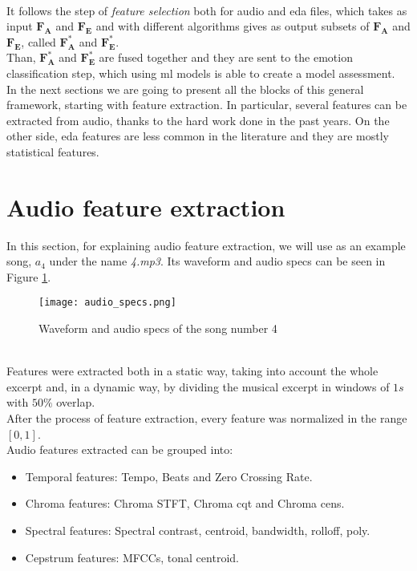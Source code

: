 \\
It follows the step of \textit{feature selection} both for audio and \gls{eda} files, which takes as input $\textbf{F}_\textbf{A}$ and $\textbf{F}_\textbf{E}$ and with different algorithms gives as output subsets of $\textbf{F}_\textbf{A}$ and $\textbf{F}_\textbf{E}$, called $\textbf{F}_\textbf{A}^*$ and $\textbf{F}_\textbf{E}^*$.
\\
Than, $\textbf{F}_\textbf{A}^*$ and $\textbf{F}_\textbf{E}^*$ are fused together and they are sent to the emotion classification step, which using \gls{ml} models is able to create a model assessment.
\\ \indent
In the next sections we are going to present all the blocks of this general framework, starting with feature extraction. In particular, several features can be extracted from audio, thanks to the hard work done in the past years. On the other side, \gls{eda} features are less common in the literature and they are mostly statistical features.

\newpage
\section{Audio feature extraction}
In this section, for explaining audio feature extraction, we will use as an example song, $a_4$ under the name \textit{4.mp3}. Its waveform and audio specs can be seen in Figure \ref{fig:audio_specs}.
\begin{figure}[h]
    \centering
    \texttt{[image: audio\_specs.png]} 
	\caption{Waveform and audio specs of the song number 4}
    \label{fig:audio_specs}
\end{figure}
\\
Features were extracted both in a static way, taking into account the whole excerpt and, in a dynamic way, by dividing the musical excerpt in windows of $1s$ with $50\%$ overlap.
\\
After the process of feature extraction, every feature was normalized in the range $[0,1]$.
\\
Audio features extracted can be grouped into:
\begin{itemize}
	\item Temporal features: Tempo, Beats and Zero Crossing Rate.
	\item Chroma features: Chroma STFT, Chroma cqt and Chroma cens.
	\item Spectral features: Spectral contrast, centroid, bandwidth, rolloff, poly.
	\item Cepstrum features: MFCCs, tonal centroid.
\end{itemize}

